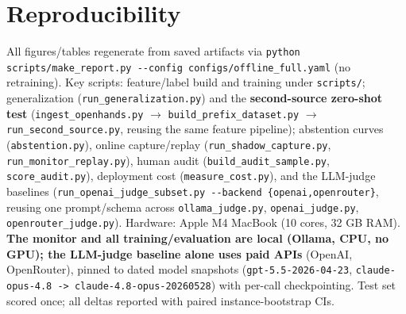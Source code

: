 \section*{Reproducibility}
All figures/tables regenerate from saved artifacts via \texttt{python scripts/make\_report.py -{}-config configs/offline\_full.yaml} (no retraining). Key scripts: feature/label build and training under \texttt{scripts/}; generalization (\texttt{run\_generalization.py}) and the \textbf{second-source zero-shot test} (\texttt{ingest\_openhands.py} $\to$ \texttt{build\_prefix\_dataset.py} $\to$ \texttt{run\_second\_source.py}, reusing the same feature pipeline); abstention curves (\texttt{abstention.py}), online capture/replay (\texttt{run\_shadow\_capture.py}, \texttt{run\_monitor\_replay.py}), human audit (\texttt{build\_audit\_sample.py}, \texttt{score\_audit.py}), deployment cost (\texttt{measure\_cost.py}), and the LLM-judge baselines (\texttt{run\_openai\_judge\_subset.py -{}-backend \{openai,openrouter\}}, reusing one prompt/schema across \texttt{ollama\_judge.py}, \texttt{openai\_judge.py}, \texttt{openrouter\_judge.py}). Hardware: Apple M4 MacBook (10 cores, 32 GB RAM). \textbf{The monitor and all training/evaluation are local (Ollama, CPU, no GPU); the LLM-judge baseline alone uses paid APIs} (OpenAI, OpenRouter), pinned to dated model snapshots (\texttt{gpt-5.5-2026-04-23}, \texttt{claude-opus-4.8 -> claude-4.8-opus-20260528}) with per-call checkpointing. Test set scored once; all deltas reported with paired instance-bootstrap CIs.

